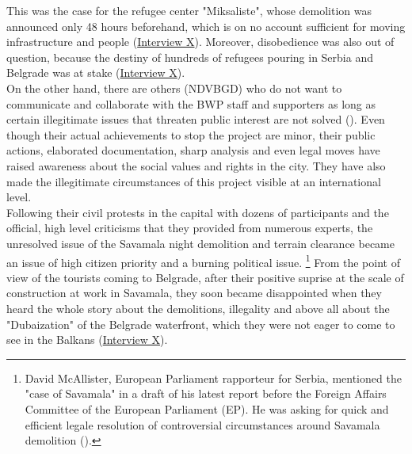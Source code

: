 \documentclass[11pt]{report}
\begin{document}
{{{This was the case for the refugee center "Miksaliste", whose demolition was announced only 48 hours beforehand, which is on no account sufficient for moving infrastructure and people
(\href{InterviewX}{Interview X}).
Moreover, disobedience was also out of question, because  the destiny of hundreds of refugees pouring in Serbia and Belgrade was at stake (\href{InterviewX}{Interview X}).
\\

On the other hand, there are others (NDVBGD) who do not want to communicate and collaborate with the BWP staff and supporters as long as certain illegitimate issues that threaten public interest are not solved (\cite{ref media}).
Even though their actual achievements to stop the project are minor, their public actions, elaborated documentation, sharp analysis and even legal moves have raised awareness about the social values and rights in the city.
They have also made the illegitimate circumstances of this project visible at an international level.
\\

Following their civil protests in the capital with dozens of participants and the official, high level criticisms that they provided from numerous experts, the unresolved issue of the Savamala night demolition and terrain clearance became an issue of high citizen priority and a burning political issue. 
\footnote{David McAllister, European Parliament rapporteur for Serbia, mentioned the "case of Savamala" in a draft of his latest report before the Foreign Affairs Committee of the European Parliament (EP). He was asking for quick and efficient legale resolution of controversial circumstances around Savamala demolition (\href{stojanovic}{\citealt{stojanovic_fajon:_2017}}).}
From the point of view of the tourists coming to Belgrade, after their positive suprise at the scale of construction at work in Savamala, they soon became disappointed when they heard the whole story about the demolitions, illegality and above all about the "Dubaization" of the Belgrade waterfront, which they were not eager to come to see in the Balkans (\href{InterviewX}{Interview X}).
\\

}}}
\end{document}
